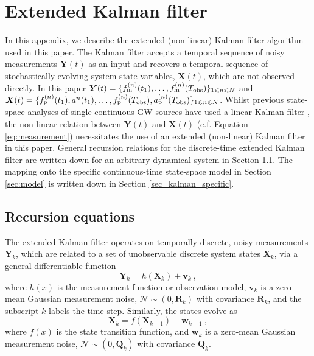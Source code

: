 \documentclass[fleqn,usenatbib,useAMS]{mnras}
\begin{document}
\section{Extended Kalman filter} \label{sec:kalman}
In this appendix, we describe the extended (non-linear) Kalman filter algorithm used in this paper. The Kalman filter accepts a temporal sequence of noisy measurements $\boldsymbol{Y}(t)$ as an input and recovers a temporal sequence of stochastically evolving system state variables, $\boldsymbol{X}(t)$, which are not observed directly. In this paper ${\boldsymbol{Y}}(t) = \{ f^{(n)}_{\rm m}(t_1), \dots, f^{(n)}_{\rm m}(T_{\rm obs})  \}_{1 \leq n \leq N}$ and ${\boldsymbol{X}}(t) = \{ f^{(n)}_{\rm p}(t_1), a^{n}(t_1), \dots, f^{(n)}_{\rm p}(T_{\rm obs}),a^{(n)}_{\rm p}(T_{\rm obs})   \}_{1 \leq n \leq N}$. Whilst previous state-space analyses of single continuous GW sources have used a linear Kalman filter \citep{KimpsonPTA1,KimpsonPTA2}, the non-linear relation between ${\boldsymbol{Y}}(t)$ and ${\boldsymbol{X}}(t)$ (c.f. Equation \eqref{eq:measurement}) necessitates the use of an extended (non-linear) Kalman filter \citep{zarchan2000fundamentals} in this paper. General recursion relations for the discrete-time extended Kalman filter are written down for an arbitrary dynamical system in Section \ref{sec_kalman_general}. The mapping onto the specific continuous-time state-space model in Section \ref{sec:model} is written down in Section \ref{sec_kalman_specific}.


\subsection{Recursion equations}\label{sec_kalman_general}
The extended Kalman filter operates on temporally discrete, noisy measurements $\boldsymbol{Y}_k$, which are related to a set of unobservable discrete system states $\boldsymbol{X}_k$, via a general differentiable function
\begin{equation}
	\boldsymbol{Y}_k = h \left(\boldsymbol{X}_k\right) + \boldsymbol{v}_k \ ,\label{eq:kalman1}
\end{equation}
where $h(x)$ is the measurement function or observation model, $\boldsymbol{v}_k$ is a zero-mean Gaussian measurement noise, $\mathcal{N} \sim (0,\boldsymbol{R}_k)$ with covariance $\boldsymbol{R}_k$, and the subscript $k$ labels the time-step. Similarly, the states evolve as
\begin{equation}
	\boldsymbol{X}_k = f \left(\boldsymbol{X}_{k-1}\right) + \boldsymbol{w}_{k-1} \ ,\label{eq:kalman1}
\end{equation}
where $f(x)$ is the state transition function, and $\boldsymbol{w}_k$ is a zero-mean Gaussian measurement noise, $\mathcal{N} \sim (0,\boldsymbol{Q}_k)$ with covariance $\boldsymbol{Q}_k$. \newline 
\end{document}
